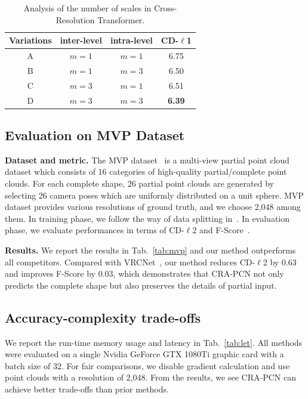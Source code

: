 \documentclass[letterpaper]{article} %
\begin{document}
{\begin{table}[!t]
\begin{center}
\begin{tabular}{c|cc|c}
\toprule
Variations& inter-level & intra-level &CD-$\ell$1 \\
\midrule
A & $m=1$  & $m = 1$ & 6.75\\
B & $m=1$   & $m =3$ & 6.50\\
C & $m=3$  & $m =1$ & 6.51\\
D & $m=3$  & $m =3$ & \bf{6.39}\\
\bottomrule
\end{tabular}
\end{center}
\caption{Analysis of the number of scales in Cross-Resolution Transformer.} 
\label{tab:ab3}
\end{table}

\subsection{Evaluation on MVP Dataset}
{\bf {Dataset and metric.}}
The MVP dataset~\cite{pan2021multi} is a  multi-view partial point cloud dataset which consists of 16 categories of high-quality partial/complete point clouds. 
For each complete shape, 26 partial point clouds are generated by selecting 26 camera poses which are uniformly distributed on a unit sphere. MVP dataset provides various resolutions of ground truth, and we choose 2,048 among them.
In training phase, we follow the way of data splitting in~\cite{pan2021variational}. In evaluation phase, we evaluate performances in terms of CD-$\ell$2 and F-Score~\cite{tatarchenko2019single}.


{\bf {Results.}}
We report the results in Tab.~\ref{tab:mvp} and our method outperforms all competitors.
Compared with VRCNet~\cite{pan2021variational}, our method reduces CD-$\ell$2 by $0.63$ and improves F-Score by $0.03$, which demonstrates that CRA-PCN not only predicts the complete shape but also preserves the details of partial input. 


\subsection{Accuracy-complexity trade-offs}
We report the run-time memory usage and latency in Tab.~\ref{tab:let}.
All methods were evaluated on a single Nvidia GeForce GTX 1080Ti graphic card with a batch size of 32.
For fair comparisons, we disable gradient calculation and use point clouds with a resolution of 2,048.
From the results, we see CRA-PCN can achieve better trade-offs than prior methods.

}
\end{document}
